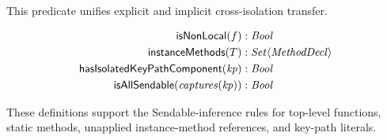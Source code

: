 This predicate unifies explicit  and implicit cross-isolation transfer.

\[
\begin{aligned}
  \textsf{isNonLocal}(f) &: \mathit{Bool} \\
  \textsf{instanceMethods}(T) &: \mathit{Set}\langle\mathit{MethodDecl}\rangle \\
  \textsf{hasIsolatedKeyPathComponent}(\mathit{kp}) &: \mathit{Bool} \\
  \textsf{isAllSendable}(\mathit{captures}(\mathit{kp})) &: \mathit{Bool}
\end{aligned}
\]

These definitions support the Sendable-inference rules for top-level functions, static methods, unapplied instance-method references, and key-path literals.
